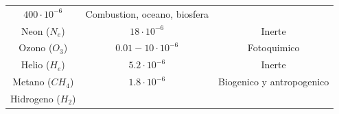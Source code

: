 \documentclass[]{book}
\begin{document}
\begin{longtable}[]{@{}ccc@{}}
\begin{minipage}[t]{0.48\columnwidth}
\(400 \cdot10^{-6}\)\strut
\end{minipage} & \begin{minipage}[t]{0.28\columnwidth}\centering
Combustion, oceano, biosfera\strut
\end{minipage}\tabularnewline
\begin{minipage}[t]{0.15\columnwidth}\centering
Neon (\(N_e\))\strut
\end{minipage} & \begin{minipage}[t]{0.48\columnwidth}\centering
\(18 \cdot10^{-6}\)\strut
\end{minipage} & \begin{minipage}[t]{0.28\columnwidth}\centering
Inerte\strut
\end{minipage}\tabularnewline
\begin{minipage}[t]{0.15\columnwidth}\centering
Ozono (\(O_3\))\strut
\end{minipage} & \begin{minipage}[t]{0.48\columnwidth}\centering
\(0.01-10 \cdot10^{-6}\)\strut
\end{minipage} & \begin{minipage}[t]{0.28\columnwidth}\centering
Fotoquimico\strut
\end{minipage}\tabularnewline
\begin{minipage}[t]{0.15\columnwidth}\centering
Helio (\(H_e\))\strut
\end{minipage} & \begin{minipage}[t]{0.48\columnwidth}\centering
\(5.2 \cdot10^{-6}\)\strut
\end{minipage} & \begin{minipage}[t]{0.28\columnwidth}\centering
Inerte\strut
\end{minipage}\tabularnewline
\begin{minipage}[t]{0.15\columnwidth}\centering
Metano (\(CH_4\))\strut
\end{minipage} & \begin{minipage}[t]{0.48\columnwidth}\centering
\(1.8 \cdot10^{-6}\)\strut
\end{minipage} & \begin{minipage}[t]{0.28\columnwidth}\centering
Biogenico y antropogenico\strut
\end{minipage}\tabularnewline
\begin{minipage}[t]{0.15\columnwidth}\centering
Hidrogeno (\(H_2\))\strut
\end{minipage} & \begin{minipage}[t]{0.48\columnwidth}\centering

\end{minipage}
\end{longtable}
\end{document}

